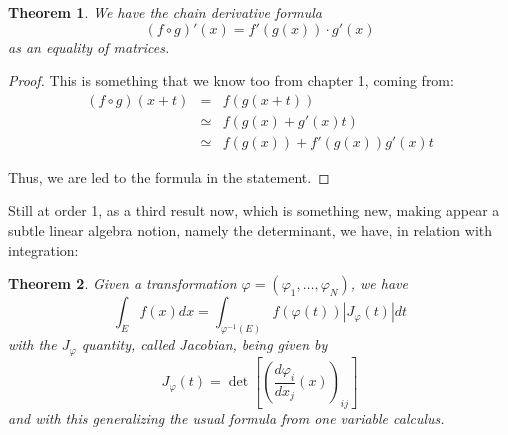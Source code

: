 \documentclass[12pt]{amsbook}
\newtheorem{theorem}{Theorem}[chapter]
\begin{document}

\begin{theorem}
We have the chain derivative formula
$$(f\circ g)'(x)=f'(g(x))\cdot g'(x)$$
as an equality of matrices.
\end{theorem}

\begin{proof}
This is something that we know too from chapter 1, coming from:
\begin{eqnarray*}
(f\circ g)(x+t)
&=&f(g(x+t))\\
&\simeq&f(g(x)+g'(x)t)\\
&\simeq&f(g(x))+f'(g(x))g'(x)t
\end{eqnarray*}

Thus, we are led to the formula in the statement.
\end{proof}

Still at order 1, as a third result now, which is something new, making appear a subtle linear algebra notion, namely the determinant, we have, in relation with integration:


\begin{theorem}
Given a transformation $\varphi=(\varphi_1,\ldots,\varphi_N)$, we have
$$\int_Ef(x)dx=\int_{\varphi^{-1}(E)}f(\varphi(t))|J_\varphi(t)|dt$$
with the $J_\varphi$ quantity, called Jacobian, being given by
$$J_\varphi(t)=\det\left[\left(\frac{d\varphi_i}{dx_j}(x)\right)_{ij}\right]$$ 
and with this generalizing the usual formula from one variable calculus.
\end{theorem}
\end{document}
